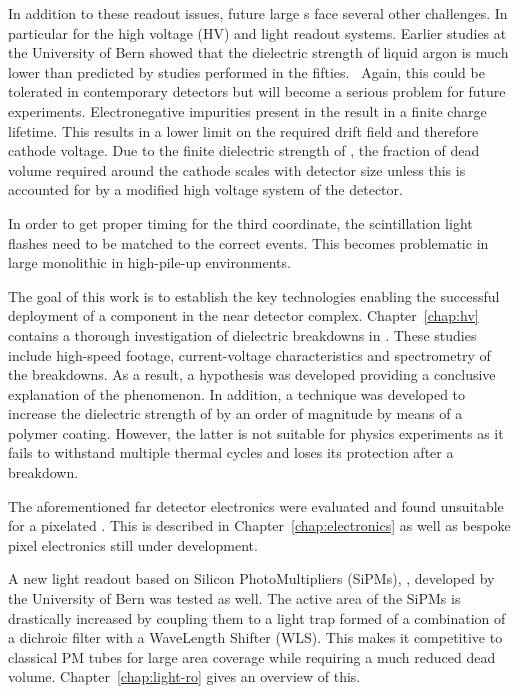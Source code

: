 In addition to these readout issues, future large \lartpc{}s face several other challenges.
In particular for the high voltage (HV) and light readout systems.
Earlier studies at the University of Bern showed that the dielectric strength of liquid argon is much lower than predicted by studies performed in the fifties.~\cite{breakdown_14, swan1, swan2}
Again, this could be tolerated in contemporary detectors but will become a serious problem for future experiments.
Electronegative impurities present in the \lar{} result in a finite charge lifetime.
This results in a lower limit on the required drift field and therefore cathode voltage.
Due to the finite dielectric strength of \lar{}, the fraction of dead volume required around the cathode scales with detector size unless this is accounted for by a modified high voltage system of the detector.

In order to get proper timing for the third coordinate, the scintillation light flashes need to be matched to the correct events.
This becomes problematic in large monolithic \lartpc{} in high-pile-up environments.

The goal of this work is to establish the key technologies enabling the successful deployment of a \lartpc{} component in the \dune{} near detector complex.
Chapter~\ref{chap:hv} contains a thorough investigation of dielectric breakdowns in \lar{}.
These studies include high-speed footage, current-voltage characteristics and spectrometry of the breakdowns.
As a result, a hypothesis was developed providing a conclusive explanation of the phenomenon.
In addition, a technique was developed to increase the dielectric strength of \lar{} by an order of magnitude by means of a polymer coating.
However, the latter is not suitable for physics experiments as it fails to withstand multiple thermal cycles and loses its protection after a breakdown.

The aforementioned far detector electronics were evaluated and found unsuitable for a pixelated \lartpc{}.
This is described in Chapter~\ref{chap:electronics} as well as bespoke pixel electronics still under development.

A new light readout based on Silicon PhotoMultipliers (SiPMs), \AL{}, developed by the University of Bern was tested as well.
The active area of the SiPMs is drastically increased by coupling them to a light trap formed of a combination of a dichroic filter with a WaveLength Shifter (WLS).
This makes it competitive to classical PM tubes for large area coverage while requiring a much reduced dead volume.
Chapter~\ref{chap:light-ro} gives an overview of this.

